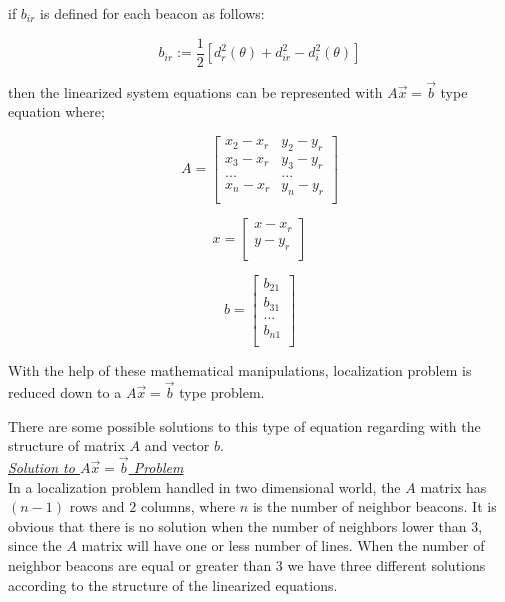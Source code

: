 if $b_{ir}$ is defined for each beacon as follows:

\begin{equation}
b_{ir} := \frac{1}{2}[d_r^2(\theta) + d_{ir}^2 - d_i^2(\theta)]
\end{equation}

then the linearized system equations can be represented with $A\vec{x} = \vec{b}$ type equation where;

\begin{equation}
A = \begin{bmatrix}
x_2 - x_r & y_2 - y_r\\
x_3 - x_r & y_3 - y_r\\
...       & ...      \\
x_n - x_r & y_n - y_r\\
\end{bmatrix}				
\end{equation}

\begin{equation}
x = \begin{bmatrix}
x - x_r\\
y - y_r\\
\end{bmatrix}
\end{equation}

\begin{equation}
b = \begin{bmatrix}
b_{21}\\
b_{31}\\
... \\
b_{n1}\\
\end{bmatrix}
\end{equation}

With the help of these mathematical manipulations, localization problem is reduced down to a $A\vec{x} = \vec{b}$ type problem.

There are some possible solutions to this type of equation regarding with the structure of matrix $A$ and vector $b$.\\

\underline {\textit{Solution to $A\vec{x} = \vec{b}$ Problem}}\\
In a localization problem handled in two dimensional world, the $A$ matrix has $(n-1)$ rows and $2$ columns, where $n$ is the number of neighbor beacons. It is obvious that there is no solution when the number of neighbors lower than $3$, since the $A$ matrix will have one or less number of lines. When the number of neighbor beacons are equal or greater than $3$ we have three different solutions according to the structure of the linearized equations.

